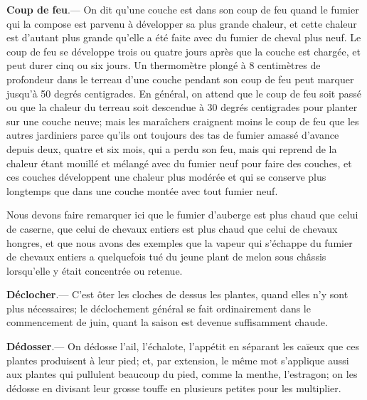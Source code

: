 \documentclass[10pt,a4paper]{book}
\begin{document}
\textbf{Coup de feu}.--- On dit qu'une couche est dans son coup de feu quand le fumier qui la compose est parvenu à développer sa plus grande chaleur, et cette chaleur est d'autant plus grande qu'elle a été faite avec du fumier de cheval plus neuf. Le coup de feu se développe trois ou quatre jours après que la couche est chargée, et peut durer cinq ou six jours. Un thermomètre plongé à 8 centimètres de profondeur dans le terreau d'une couche pendant son coup de feu peut marquer jusqu'à 50 degrés centigrades. En général, on attend que le coup de feu soit passé ou que la chaleur du terreau soit descendue à 30 degrés centigrades pour planter sur une couche neuve; mais les maraîchers craignent moins le coup de feu que les autres jardiniers parce qu'ils ont toujours des tas de fumier amassé d'avance depuis deux, quatre et six mois, qui a perdu son feu, mais qui reprend de la chaleur étant mouillé et mélangé avec du fumier neuf pour faire des couches, et ces couches développent une chaleur plus modérée et qui se conserve plus longtemps que dans une couche montée avec tout fumier neuf.

Nous devons faire remarquer ici que le fumier d'auberge est plus chaud que celui de caserne, que celui de chevaux entiers est plus chaud que celui de chevaux hongres, et que nous avons des exemples que la vapeur qui s'échappe du fumier de chevaux entiers a quelquefois tué du jeune plant de melon sous châssis lorsqu'elle y était concentrée ou retenue.

\textbf{Déclocher}.--- C'est ôter les cloches de dessus les plantes, quand elles n'y sont plus nécessaires; le déclochement général se fait ordinairement dans le commencement de juin, quant la saison est devenue suffisamment chaude.

\textbf{Dédosser}.--- On dédosse l'ail, l'échalote, l'appétit en séparant les caïeux que ces plantes produisent à leur pied; et, par extension, le même mot s'applique aussi aux plantes qui pullulent beaucoup du pied, comme la menthe, l'estragon; on les dédosse en divisant leur grosse touffe en plusieurs petites pour les multiplier.
\end{document}
